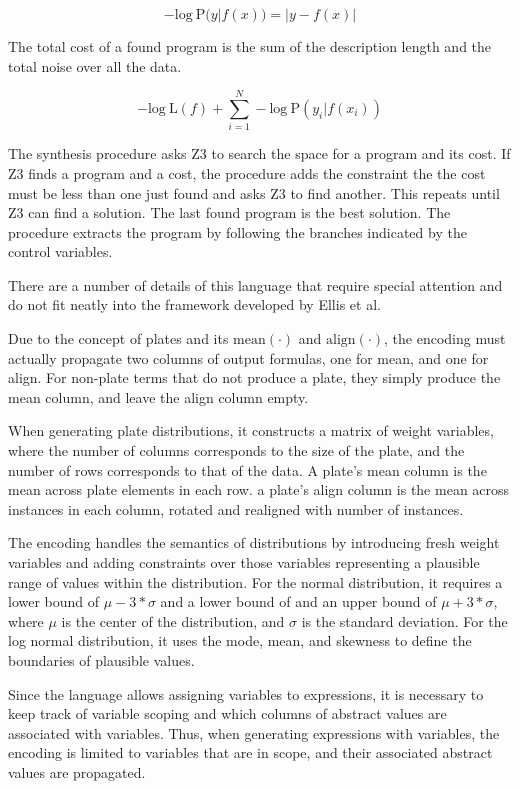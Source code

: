 \documentclass[runningheads]{llncs}
\begin{document}
\[
    - \text{log}\ \text{P}(y|f(x)) = |y - f(x)| 
\]

The total cost of a found program is the sum of the description length and the total noise over all the data. 

\[
    - \text{log}\ \text{L}(f) + \sum_{i=1}^N - \text{log}\ \text{P}(y_i|f(x_i))
\]

The synthesis procedure asks Z3 to search the space for a program
and its cost. If Z3 finds a program and a cost, the procedure 
adds the constraint the the cost must be less than one just found
and asks Z3 to find another. This repeats until Z3 can find a solution.
The last found program is the best solution. The procedure 
extracts the program by following the branches indicated by the 
control variables. 

There are a number of details of this language that require 
special attention and do not fit neatly into the framework  
developed by Ellis et al.

Due to the concept of plates and its 
$\text{mean}(\cdot)$ and $\text{align}(\cdot)$,
the encoding must actually propagate two columns of output formulas,
one for mean, and one for align. 
For non-plate terms that do not produce a plate, they simply
produce the mean column, and leave the align column empty.  

When generating plate distributions, it constructs a matrix of weight variables,
where the number of columns corresponds to the size of the plate, and the number of rows corresponds
to that of the data.
A plate's mean column is the mean across plate elements in each row. 
a plate's align column is the mean across instances in each column, rotated and realigned with number of instances. 

The encoding handles the semantics of distributions by introducing fresh weight variables  
and adding constraints over those variables representing a plausible range of values
within the distribution. For the normal distribution, it requires a lower bound of 
$\mu - 3 * \sigma$ and a lower bound of and an upper bound of $\mu + 3 * \sigma$,
where $\mu$ is the center of the distribution, and $\sigma$ is the standard deviation.
For the log normal distribution, it uses the mode, mean, and skewness to define the boundaries
of plausible values. 

Since the language allows assigning variables to expressions, it is necessary to keep track
of variable scoping and which columns of abstract values are associated with variables. 
Thus, when generating expressions with variables, the encoding is limited to variables that
are in scope, and their associated abstract values are propagated.
\end{document}
